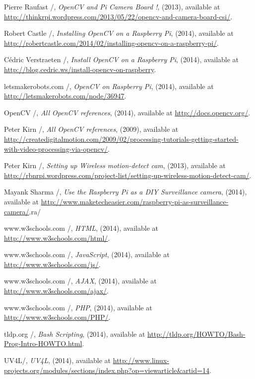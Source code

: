 \documentclass[12pt]{report}
\begin{document}
\begin{thebibliography}{99}
 Pierre Raufast /, \emph{OpenCV and Pi Camera Board !}, (2013), available at
\url{http://thinkrpi.wordpress.com/2013/05/22/opencv-and-camera-board-csi/}.


 Robert Castle /, \emph{Installing OpenCV on a Raspberry Pi}, (2014), available at
\url{http://robertcastle.com/2014/02/installing-opencv-on-a-raspberry-pi/}.

 Cédric Verstraeten /, \emph{Install OpenCV on a Raspberry Pi}, (2014), available at
\url{http://blog.cedric.ws/install-opencv-on-raspberry}.

 letsmakerobots.com /, \emph{OpenCV on Raspberry Pi}, (2014), available at
\url{http://letsmakerobots.com/node/36947}.

 OpenCV /, \emph{All OpenCV references}, (2014), available at
\url{http://docs.opencv.org/}.

 Peter Kirn /, \emph{All OpenCV references}, (2009), available at
\url{http://createdigitalmotion.com/2009/02/processing-tutorials-getting-started-with-video-processing-via-opencv/}.

 Peter Kirn /, \emph{Setting up Wireless motion-detect cam}, (2013), available at
\url{http://rbnrpi.wordpress.com/project-list/setting-up-wireless-motion-detect-cam/}.

 Mayank Sharma /, \emph{Use the Raspberry Pi as a DIY Surveillance camera}, (2014), available at
\url{http://www.maketecheasier.com/raspberry-pi-as-surveillance-camera/}.ra/


 www.w3schools.com /, \emph{HTML}, (2014), available at
\url{http://www.w3schools.com/html/}.

 www.w3schools.com /, \emph{JavaScript}, (2014), available at
\url{http://www.w3schools.com/js/}.

 www.w3schools.com /, \emph{AJAX}, (2014), available at
\url{http://www.w3schools.com/ajax/}.

 www.w3schools.com /, \emph{PHP}, (2014), available at
\url{http://www.w3schools.com/PHP/}.

 tldp.org /, \emph{Bash Scripting}, (2014), available at
\url{http://tldp.org/HOWTO/Bash-Prog-Intro-HOWTO.html}.

UV4L/, \emph{UV4L}, (2014), available at
\url{http://www.linux-projects.org/modules/sections/index.php?op=viewarticle&artid=14}.


\end{thebibliography}
\end{document}
